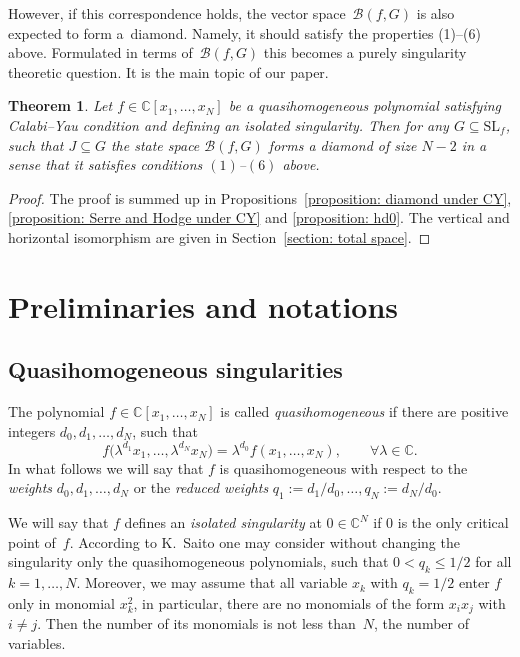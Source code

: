 \documentclass[10pt,a4paper]{article}
\numberwithin{equation}{section}
\newtheorem{Theorem}{Theorem}[section]
\newcommand{\CC}{{\mathbb{C}}}
\newcommand{\SL}{{\mathrm{SL}}}
\def\B{{\mathcal B}}
\begin{document}
However, if this correspondence holds, the vector space~$\B(f,G)$ is also expected to form a~diamond. Namely, it should satisfy the properties (1)--(6) above. Formulated in terms of~$\B(f,G)$ this becomes a purely singularity theoretic question.
It is the main topic of our paper.


\begin{Theorem}\label{theorem: main}
	Let $f \in \CC[x_1,\dots,x_N]$ be a quasihomogeneous polynomial satisfying Calabi--Yau condition and defining an isolated singularity.
	Then for any $G \subseteq \SL_f$, such that $J \subseteq G$ the state space $\B(f,G)$ forms a diamond of size $N-2$ in a sense that it satisfies conditions $(1)$--$(6)$ above.
\end{Theorem}

\begin{proof}
	The proof is summed up in Propositions~\ref{proposition: diamond under CY}, \ref{proposition: Serre and Hodge under CY} and \ref{proposition: hd0}.
	The vertical and horizontal isomorphism are given in Section~\ref{section: total space}.
\end{proof}

\section{Preliminaries and notations}

\subsection{Quasihomogeneous singularities}

The polynomial $f \in \CC[x_1,\dots,x_N]$ is called \textit{quasihomogeneous} if there are positive integers $d_0,d_1,\dots,d_N$, such that
\begin{equation}\label{QH1}
	f\bigl(\lambda^{d_1}x_1,\dots,\lambda^{d_N}x_N\bigr) = \lambda^{d_0} f(x_1,\dots,x_N), \qquad \forall \lambda \in \CC.
\end{equation}
In what follows we will say that $f$ is quasihomogeneous with respect to the \textit{weights} $d_0,d_1,\dots,d_N$ or the \textit{reduced weights} $q_1 := d_1/d_0,\dots,q_N:= d_N/d_0$.

We will say that $f$ defines an \textit{isolated singularity} at $0 \in \CC^N$ if $0$ is the only critical point of~$f$.
According to K.~Saito \cite[Satz~1.3]{S71} one may consider without changing the singularity only the quasihomogeneous polynomials, such that $0 < q_k \le 1/2$ for all $k=1,\dots,N$. Moreover, we may assume that all variable $x_k$ with $q_k=1/2$ enter $f$ only in monomial $x_k^2$, in particular, there are no monomials of the form $x_ix_j$ with $i\ne j$. Then the number of its monomials is not less than~$N$, the number of variables.
\end{document}

